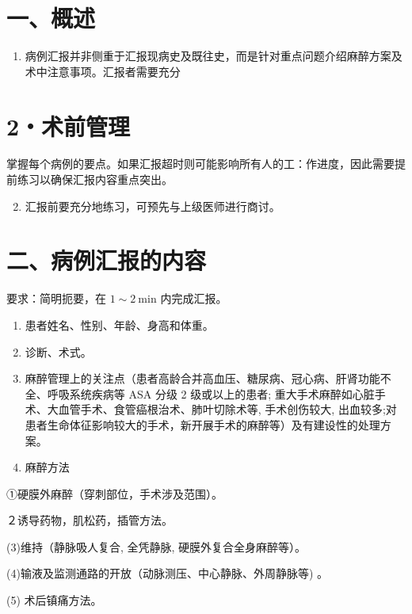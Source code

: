 \documentclass[10pt]{article}
\begin{document}
\section*{一、概述}
\begin{enumerate}
  \item 病例汇报并非侧重于汇报现病史及既往史，而是针对重点问题介绍麻醉方案及术中注意事项。汇报者需要充分
\end{enumerate}

\section*{2・术前管理}
掌握每个病例的要点。如果汇报超时则可能影响所有人的工：作进度，因此需要提前练习以确保汇报内容重点突出。

\begin{enumerate}
  \setcounter{enumi}{1}
  \item 汇报前要充分地练习，可预先与上级医师进行商讨。
\end{enumerate}

\section*{二、病例汇报的内容}
要求：简明扼要，在 $1 \sim 2 \mathrm{~min}$ 内完成汇报。

\begin{enumerate}
  \item 患者姓名、性别、年龄、身高和体重。

  \item 诊断、术式。

  \item 麻醉管理上的关注点（患者高龄合并高血压、糖尿病、冠心病、肝肾功能不全、呼吸系统疾病等 ASA 分级 2 级或以上的患者; 重大手术麻醉如心脏手术、大血管手术、食管癌根治术、肺叶切除术等, 手术创伤较大, 出血较多;对患者生命体征影响较大的手术，新开展手术的麻醉等）及有建设性的处理方案。

  \item 麻醉方法

\end{enumerate}

①硬膜外麻醉（穿刺部位，手术涉及范围）。

２诱导药物，肌松药，插管方法。

(3)维持（静脉吸人复合, 全凭静脉, 硬膜外复合全身麻醉等）。

(4)输液及监测通路的开放（动脉测压、中心静脉、外周静脉等) 。

(5) 术后镇痛方法。
\end{document}
